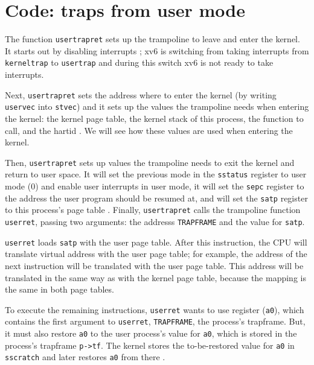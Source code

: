 \section{Code: traps from user mode}

The function \lstinline{usertrapret}
 sets up the trampoline to leave
and enter the kernel.  It starts out by disabling interrupts
; xv6 is switching from taking
interrupts from \lstinline{kerneltrap} to \lstinline{usertrap} and
during this switch xv6 is not ready to take interrupts.

Next, \lstinline{usertrapret} sets the address where to enter the
kernel (by writing \lstinline{uservec} into \lstinline{stvec}) and it
sets up the values the trampoline needs when entering the kernel: the
kernel page table, the kernel stack of this process, the function to
call, and the hartid
.  We will see
how these values are used when entering the kernel.

Then, \lstinline{usertrapret} sets up values the trampoline needs to
exit the kernel and return to user space.  It will set the
previous mode in the \lstinline{sstatus} register to user mode (0) and
enable user interrupts in user mode, it will set the \lstinline{sepc}
register to the address the user program should be resumed at, and
will set the \lstinline{satp} register to this process's page table
.
Finally, \lstinline{usertrapret} calls
the trampoline function \lstinline{userret}, passing two arguments: the addresss
\lstinline{TRAPFRAME} and the value for \lstinline{satp}.

\lstinline{userret}  loads
\lstinline{satp} with the user page table.  After this instruction,
the CPU will translate virtual address with the user page table;
for example, the address of the next instruction will be translated
with the user page table.  This address will be translated in the same
way as with the kernel page table, because the mapping is the same in
both page tables.

To execute the remaining instructions, \lstinline{userret} wants to
use register (\lstinline{a0}), which contains the first argument to
\lstinline{userret}, \lstinline{TRAPFRAME}, the process's
trapframe. But, it must also restore \lstinline{a0} to the user
process's value for \lstinline{a0}, which is stored in the process's
trapframe \lstinline{p->tf}.  The kernel stores the to-be-restored value for
\lstinline{a0} in \lstinline{sscratch} and later restores
\lstinline{a0} from there .

